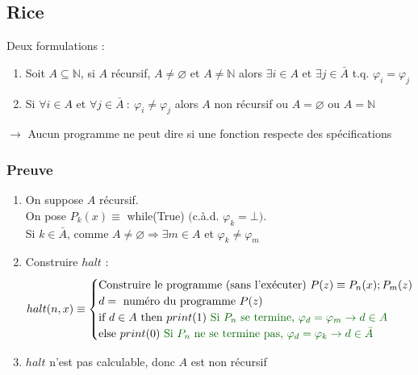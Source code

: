 \subsection{Rice}

Deux formulations :
\begin{enumerate}
\item Soit $A \subseteq \mathbb{N}$, si $A$ récursif, $A \neq \varnothing$ et $A \neq \mathbb{N}$ alors $\exists i \in A$ et $\exists j \in \bar{A}$ t.q. $\varphi_i = \varphi_j$
\item Si $\forall i \in A$ et $\forall j \in \bar{A} \ : \ \varphi_i \neq \varphi_j$ alors $A$ non récursif ou $A = \varnothing$ ou $A = \mathbb{N}$
\end{enumerate}
$\rightarrow$ Aucun programme ne peut dire si une fonction respecte des spécifications


\subsubsection{Preuve}

\begin{enumerate}
\item On suppose $A$ récursif.\\
	On pose $P_k(x) \equiv$ while(True) $($c.à.d. $\varphi_k = \bot)$.\\
	Si $k \in \bar{A}$, comme $A \neq \varnothing \Rightarrow \exists m \in A$ et $\varphi_k \neq \varphi_m$
\item Construire $halt$ :
	\begin{equation*}
		 halt(n,x) \equiv
		 \begin{cases}
		 \text{Construire le programme (sans l'exécuter) } P(z) \equiv P_n(x); P_m(z)\\
		 d = \text{ numéro du programme }P(z)\\
		 \text{if } d \in A \text{ then } print(1) \ \green{\text{Si }P_n \text{ se termine, } \varphi_d = \varphi_m \rightarrow d \in A}\\
		 \text{else } print(0) \ \green{\text{Si }P_n \text{ ne se termine pas, } \varphi_d = \varphi_k \rightarrow d \in \bar{A}}\\
		 \end{cases}
	\end{equation*}
\item $halt$ n'est pas calculable, donc $A$ est non récursif
\end{enumerate}

